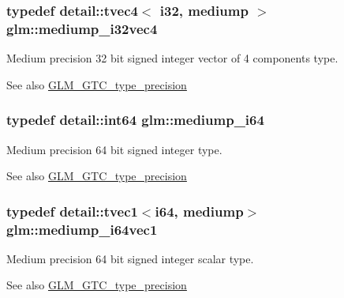 \subsubsection[{\texorpdfstring{mediump\+\_\+i32vec4}{mediump_i32vec4}}]{\setlength{\rightskip}{0pt plus 5cm}typedef detail\+::tvec4$<$ i32, mediump $>$ {\bf glm\+::mediump\+\_\+i32vec4}}\hypertarget{group__gtc__type__precision_ga68126328090f37655d8218c5a5fb8ae5}{}\label{group__gtc__type__precision_ga68126328090f37655d8218c5a5fb8ae5}
Medium precision 32 bit signed integer vector of 4 components type. \begin{DoxySeeAlso}{See also}
\hyperlink{group__gtc__type__precision}{G\+L\+M\+\_\+\+G\+T\+C\+\_\+type\+\_\+precision} 
\end{DoxySeeAlso}
\subsubsection[{\texorpdfstring{mediump\+\_\+i64}{mediump_i64}}]{\setlength{\rightskip}{0pt plus 5cm}typedef detail\+::int64 {\bf glm\+::mediump\+\_\+i64}}\hypertarget{group__gtc__type__precision_ga90fedf6c701ffbe00535156715e50787}{}\label{group__gtc__type__precision_ga90fedf6c701ffbe00535156715e50787}
Medium precision 64 bit signed integer type. \begin{DoxySeeAlso}{See also}
\hyperlink{group__gtc__type__precision}{G\+L\+M\+\_\+\+G\+T\+C\+\_\+type\+\_\+precision} 
\end{DoxySeeAlso}
\subsubsection[{\texorpdfstring{mediump\+\_\+i64vec1}{mediump_i64vec1}}]{\setlength{\rightskip}{0pt plus 5cm}typedef detail\+::tvec1$<$i64, mediump$>$ {\bf glm\+::mediump\+\_\+i64vec1}}\hypertarget{group__gtc__type__precision_gad2423a91c791b9ca2f8a3ecfc71b080d}{}\label{group__gtc__type__precision_gad2423a91c791b9ca2f8a3ecfc71b080d}
Medium precision 64 bit signed integer scalar type. \begin{DoxySeeAlso}{See also}
\hyperlink{group__gtc__type__precision}{G\+L\+M\+\_\+\+G\+T\+C\+\_\+type\+\_\+precision} 
\end{DoxySeeAlso}

